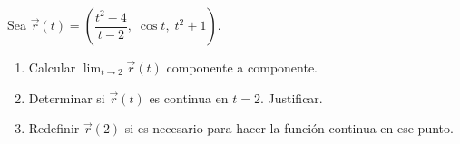 Sea $\vec{r}(t) = \left(\dfrac{t^2 - 4}{t - 2},\; \cos t,\; t^2 + 1\right)$.
\begin{enumerate}
    \item Calcular $\displaystyle\lim_{t \to 2} \vec{r}(t)$ componente a componente.
    \item Determinar si $\vec{r}(t)$ es continua en $t = 2$. Justificar.
    \item Redefinir $\vec{r}(2)$ si es necesario para hacer la función continua en ese punto.
\end{enumerate}